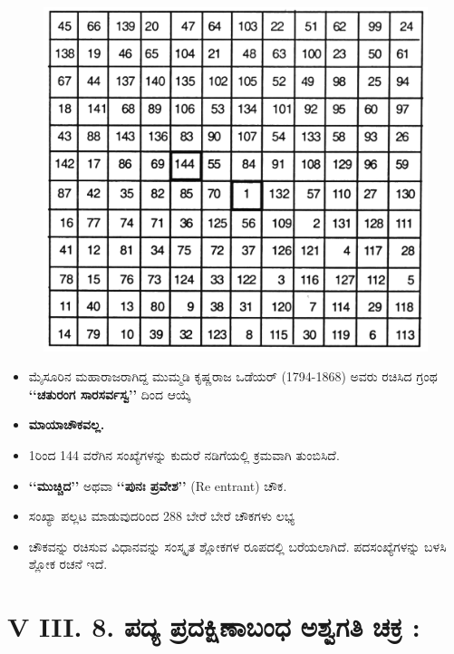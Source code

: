\begin{figure}[H]
\includegraphics{src/figures/chap6/fig6.10.jpg}
\end{figure}
\begin{itemize}
	\item ಮೈಸೂರಿನ ಮಹಾರಾಜರಾಗಿದ್ದ ಮುಮ್ಮಡಿ ಕೃಷ್ಣರಾಜ ಒಡೆಯರ್ (1794-1868) ಅವರು ರಚಿಸಿದ ಗ್ರಂಥ \textbf{‘‘ಚತುರಂಗ ಸಾರಸರ್ವಸ್ವ’’} ದಿಂದ ಆಯ್ಕೆ
	\item \textbf{ಮಾಯಾಚೌಕವಲ್ಲ.}
	\item 1ರಿಂದ 144 ವರೆಗಿನ ಸಂಖ್ಯೆಗಳನ್ನು ಕುದುರೆ ನಡಿಗೆಯಲ್ಲಿ ಕ್ರಮವಾಗಿ ತುಂಬಿಸಿದೆ.
	\item \textbf{‘‘ಮುಚ್ಚಿದ’’} ಅಥವಾ \textbf{‘‘ಪುನಃ ಪ್ರವೇಶ’’} (Re entrant) ಚೌಕ.
	\item ಸಂಖ್ಯಾ ಪಲ್ಲಟ ಮಾಡುವುದರಿಂದ 288 ಬೇರೆ ಬೇರೆ ಚೌಕಗಳು ಲಭ್ಯ
	\item ಚೌಕವನ್ನು ರಚಿಸುವ ವಿಧಾನವನ್ನು ಸಂಸ್ಕೃತ ಶ್ಲೋಕಗಳ ರೂಪದಲ್ಲಿ ಬರೆಯಲಾಗಿದೆ. ಪದಸಂಖ್ಯೆಗಳನ್ನು ಬಳಸಿ ಶ್ಲೋಕ ರಚನೆ ಇದೆ.
\end{itemize}

\section*{V III. 8. ಪದ್ಯ ಪ್ರದಕ್ಷಿಣಾಬಂಧ ಅಶ್ವಗತಿ ಚಕ್ರ :}

